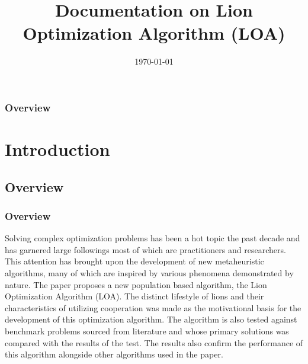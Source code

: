 \documentclass{beamer}
\title[Documentation on LOA]{Documentation on Lion Optimization Algorithm (LOA)} %
\author[Tyrel Dogup, Deo Fetalvero]
{%
   \texorpdfstring{
        \begin{columns}
            \column{.45\linewidth}
            \centering
            Tyrel Justin A. Dogup\\
            \href{mailto:tadogup1@up.edu.ph}{tadogup1@up.edu.ph}
            \column{.45\linewidth}
            \centering
            Deo Franc M. Fetalvero\\
            \href{mailto:dmfetalvero@up.edu.ph}{dmfetalvero@up.edu.ph}
        \end{columns}
   }
   {John Doe \& Jane Doe}
}
\date{\today} %
\begin{document}
\begin{frame}
\titlepage %
\end{frame}

\begin{frame}
\frametitle{Overview} %
\tableofcontents %
\end{frame}


\section{Introduction} %

\subsection{Overview} %

\begin{frame}
\frametitle{Overview}
Solving complex optimization problems has been a hot topic the past decade and has garnered large followings most of which are practitioners and researchers. This attention has brought upon the development of new metaheuristic algorithms, many of which are inspired by various phenomena demonstrated by nature.
The paper proposes a new population based algorithm, the Lion Optimization Algorithm (LOA). The distinct lifestyle of lions and their characteristics of utilizing cooperation was made as the motivational basis for the development of this optimization algorithm. The algorithm is also tested against benchmark problems sourced from literature and whose primary solutions was compared with the results of the test. The results also confirm the performance of this algorithm alongside other algorithms used in the paper.
\end{frame}
\end{document}

